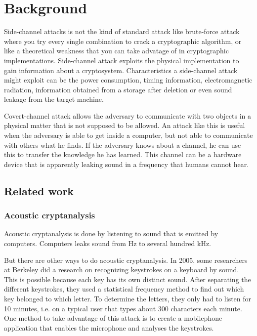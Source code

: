 \chapter{Background}
\label{chp:background} 

Side-channel attacks is not the kind of standard attack like brute-force attack where you try every single combination to crack a cryptographic algorithm, or like a theoretical weakness that you can take advatage of in cryptographic implementations. 
Side-channel attack exploits the physical implementation to gain information about a cryptosystem.
Characteristics a side-channel attack might exploit can be the power consumption, timing information, electromagnetic radiation, information obtained from a storage after deletion or even sound leakage from the target machine.

Covert-channel attack allows the adversary to communicate with two objects in a physical matter that is not supposed to be allowed. An attack like this is useful when the adversary is able to get inside a computer, but not able to communicate with others what he finds. 
If the adversary knows about a channel, he can use this to transfer the knowledge he has learned.
This channel can be a hardware device that is apparently leaking sound in a frequency that humans cannot hear. \cite{wiki_side_channel}


\section{Related work}\label{sec:related_work}

\subsection{Acoustic cryptanalysis}\label{sec:acoustic_cryptanalysis}

Acoustic cryptanalysis\cite{wiki_acoustic} is done by listening to sound that is emitted by computers. 
Computers leaks sound from Hz to several hundred kHz. 

But there are other ways to do acoustic cryptanalysis. In 2005, some researchers at Berkeley did a research\cite{keystrokes} on recognizing keystrokes on a keyboard by sound. 
This is possible because each key has its own distinct sound. 
After separating the different keystrokes, they used a statistical frequency method to find out which key belonged to which letter. 
To determine the letters, they only had to listen for 10 minutes, i.e. on a typical user that types about 300 characters each minute. 
One method to take advantage of this attack is to create a mobilephone application that enables the microphone and analyses the keystrokes. 

